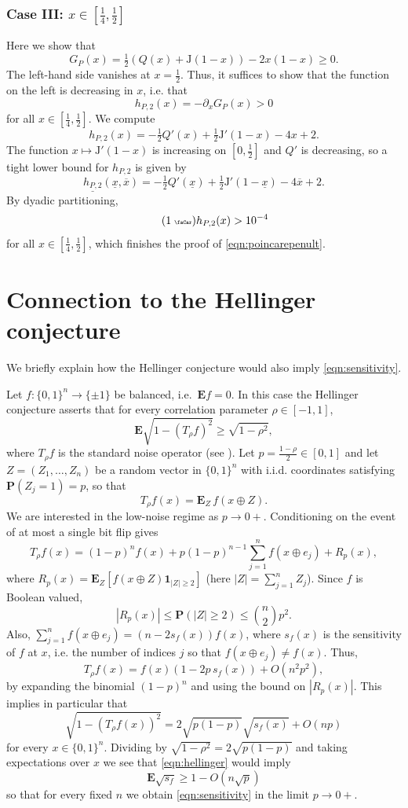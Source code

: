 \documentclass[11pt]{amsart}
\theoremstyle{plain}
\newcommand{\auto}{\tag{\addtocounter{equation}{1}\theequation\;{\tiny\faCar}}}
\theoremstyle{definition}
\theoremstyle{remark}
\numberwithin{equation}{section}
\begin{document}
\subsubsection*{Case III: $x\in [\tfrac14,\tfrac12]$}
Here we show that
\[G_P(x) = \tfrac{1}{2}( Q(x) + {\mathrm{J}}(1-x)) - 2x(1-x) \ge 0.\]
The left-hand side vanishes at $x=\tfrac12$. Thus, it suffices to show that the function on the left is decreasing in $x$, i.e. that
\[h_{P,2}(x)=-\partial_x G_{P}(x)>0\]
for all $x\in [\frac14,\frac12]$.
We compute
\[ h_{P,2}(x)=-\tfrac{1}{2} Q'(x)+\tfrac{1}{2} {\mathrm{J}}'(1-x) - 4x+2. \]
The function $x\mapsto {\mathrm{J}}'(1-x)$ is increasing on $[0, \tfrac12]$
and $Q'$ is decreasing, so
a tight lower bound for $h_{P,2}$ is given by
\[ \underline{h_{P,2}}(\underline{x},\overline{x}) = - \tfrac{1}{2} Q'(\underline{x}) + \tfrac{1}{2} {\mathrm{J}}'(1-\underline{x}) -4\overline{x}+2 .\]
By dyadic partitioning,
\begin{equation}\label{eqn:h_P_2_auto}\auto
h_{P,2}(x) > 10^{-4}
\end{equation}
for all $x\in[\frac14,\frac12]$, which finishes the proof of \eqref{eqn:poincarepenult}.

\section{Connection to the Hellinger conjecture}\label{sec:it}
We briefly explain how the Hellinger conjecture would also imply \eqref{eqn:sensitivity}.

Let $f:\{0,1\}^n\to \{\pm 1\}$ be balanced, i.e.\ $\mathbf{E} f =0$.
In this case the Hellinger conjecture \cite{ABCJN17,CN24,CGN25} asserts that for every correlation parameter $\rho \in [-1,1]$,
\begin{equation}\label{eqn:hellinger}
\mathbf{E}\sqrt{1 - (T_\rho f)^2} \ge \sqrt{1-\rho^2},
\end{equation}
where $T_\rho f$ is the standard noise operator (see \cite{ODonnell}). Let $p=\tfrac{1-\rho}{2}\in [0,1]$ and let $Z=(Z_1,\dots,Z_n)$ be a random vector in $\{0,1\}^n$ with i.i.d. coordinates satisfying $\mathbf{P}(Z_j=1)=p$, so that
\[ T_\rho f(x) = \mathbf{E}_{Z}\,f(x\oplus Z).\]
We are interested in the low-noise regime as $p\to 0+$.
Conditioning on the event of at most a single bit flip gives
\[ T_\rho f(x) = (1-p)^n f(x) + p (1-p)^{n-1} \sum_{j=1}^n f(x\oplus e_j) + R_p(x), \]
where $R_p(x)=\mathbf{E}_Z [f(x\oplus Z)\mathbf{1}_{|Z|\ge 2}]$ (here $|Z|=\sum_{j=1}^n Z_j$).
Since $f$ is Boolean valued,
\[ |R_{p}(x)| \le \mathbf{P}(|Z|\ge 2) \le \binom{n}{2} p^2. \]
Also, $\sum_{j=1}^n f(x\oplus e_j) = (n-2s_f(x))f(x)$,
where $s_f(x)$ is the sensitivity of $f$ at $x$, i.e. the number of indices $j$ so that $f(x\oplus e_j)\not=f(x)$.
Thus,
\[
T_\rho f(x)
= f(x)(1-2p\, s_f(x))+O(n^2 p^2),
\]
by expanding the binomial $(1-p)^n$ and using the bound on $|R_{p}(x)|$.
This implies in particular that
\[ \sqrt{1-(T_\rho f(x))^2} = 2\sqrt{p(1-p)} \sqrt{s_f(x)} + O(n p)\]
for every $x\in \{0,1\}^n$.
Dividing by $\sqrt{1-\rho^2}=2\sqrt{p(1-p)}$ and taking expectations over $x$ we see that
\eqref{eqn:hellinger} would imply
\[ \mathbf{E} \sqrt{s_f} \ge 1 - O(n \sqrt{p}) \]
so that for every fixed $n$ we obtain \eqref{eqn:sensitivity} in the limit $p\to 0+$.
\end{document}

